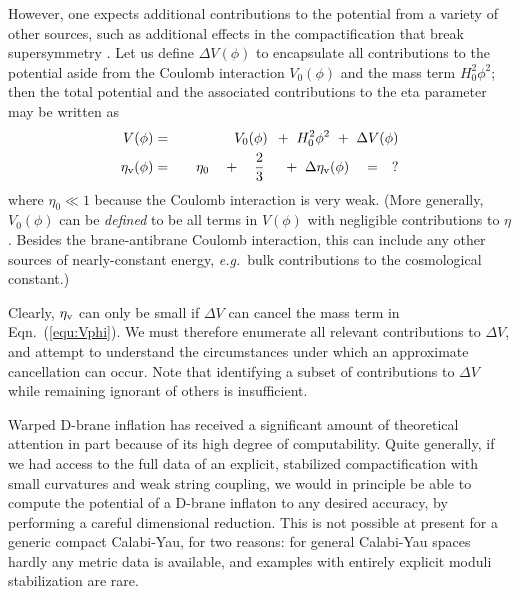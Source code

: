 \documentclass[12pt,letterpaper,rotate]{article}
\begin{document}
{However, one expects additional contributions to the potential from a variety of other sources, such as additional effects in the compactification that break supersymmetry \cite{Baumann:2008kq}.  Let us define $\Delta V(\phi)$ to encapsulate all contributions to the potential aside from the Coulomb interaction $V_{0}(\phi)$ and the mass term $H_0^2 \phi^2$; then the total potential and the associated contributions to the eta parameter may be written as
\begin{eqnarray}
\label{equ:Vphi}
V(\phi) &=& V_{0}(\phi) \ \, + \ H^2_0 \phi^2 \ + \ \Delta V(\phi) \\
\eta_{\rm v}(\phi) &=& \quad \eta_0 \quad +  \quad\frac{2}{3} \ \ \ \ + \  \Delta \eta_{\rm v}(\phi) \quad = \quad  ?
\end{eqnarray}
where $\eta_0\ll 1$ because the
Coulomb interaction is very weak.
(More generally, $V_0(\phi)$ can be {\it defined} to be all terms in $V(\phi)$ with negligible contributions to $\eta$. Besides the brane-antibrane Coulomb interaction, this can include any other sources of nearly-constant energy, {\it e.g.}~bulk contributions to the cosmological constant.)

Clearly, $\eta_{\rm v}$ can only be small if $\Delta V$ can cancel the mass term in Eqn.~(\ref{equ:Vphi}).  We must therefore enumerate all relevant contributions to $\Delta V$, and attempt to understand the circumstances under which an approximate cancellation can occur.  Note that identifying a subset of contributions to $\Delta V$ while remaining ignorant of others is insufficient.

Warped D-brane inflation
has received a significant amount of theoretical attention in part because of its high degree of computability.  Quite generally, if we had access to the full data of an explicit, stabilized compactification with small curvatures and weak string coupling, we would in principle be able to compute the potential of a D-brane inflaton to any desired accuracy, by performing a careful dimensional reduction.  This is not possible at present for a generic compact Calabi-Yau, for two reasons: for general Calabi-Yau spaces hardly any metric data is available, and examples with entirely explicit moduli stabilization are rare.

}
\end{document}
